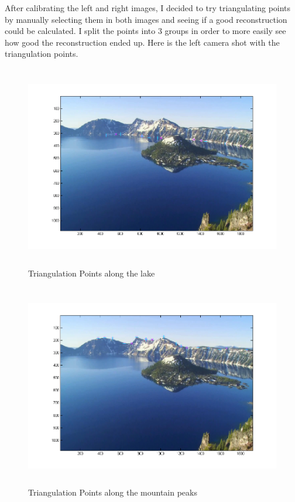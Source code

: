 \documentclass[11pt,psfig]{article}
\begin{document}
After calibrating the left and right images, I decided to try triangulating points by manually selecting them in both images and seeing if a good reconstruction could be calculated. I split the points into 3 groups in order to more easily see how good the reconstruction ended up. Here is the left camera shot with the triangulation points. 
\begin{figure}[H]
\centering
\includegraphics[height=3.5in]{sfmResults1/photoLeft_lakeRidgePoints.png}
\caption{Triangulation Points along the lake}
\end{figure}
\begin{figure}[H]
\centering
\includegraphics[height=3.5in]{sfmResults1/photoLeft_topRidgePoints.png}
\caption{Triangulation Points along the mountain peaks}
\end{figure}
\end{document}
